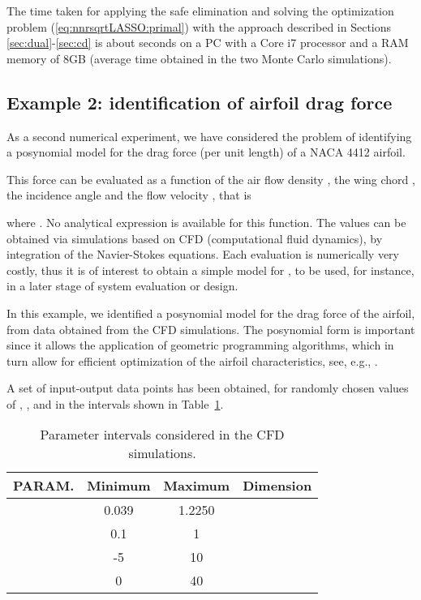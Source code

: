 \documentclass[11pt]{article}
\begin{document}
The time taken for applying the safe elimination and solving the optimization
problem (\ref{eq:nnrsqrtLASSO:primal}) with the approach described
in Sections \ref{sec:dual}-\ref{sec:cd} is about  seconds on
a PC with a Core i7 processor and a RAM memory of 8GB (average time
obtained in the two Monte Carlo simulations).

\subsection{Example 2: identification of airfoil drag force}

As a second numerical experiment, we have considered the problem of identifying
a posynomial model for the drag force (per unit length) of a NACA
4412 airfoil. 

This force can be evaluated as a function of the air flow
density , the wing chord , the incidence angle 
and the flow velocity , that is 

where . No analytical expression is available for this function. The values 
can be obtained via simulations based on CFD (computational fluid dynamics),
by integration of the Navier-Stokes equations. Each evaluation is
numerically very costly, thus it is of interest to obtain a simple
model for , to be used, for instance, in a later stage of
system evaluation or design. 

In this example, we identified a posynomial model for the drag force
of the airfoil, from data obtained from the CFD simulations. The posynomial
form is important since it allows the application of geometric programming
algorithms, which in turn allow for efficient optimization of the
airfoil characteristics, see, e.g., \cite{HoAb12}.


A set 
of  input-output data points has been obtained, for randomly
chosen values of , ,  and  in the intervals
shown in Table~\ref{tab_param}. 

\begin{table}[htb]
\centering

\begin{tabular}{|c|c|c|c|}
\hline 
PARAM.  & Minimum  & Maximum  & Dimension \tabularnewline
\hline 
  & 0.039  & 1.2250  &  \tabularnewline
\hline 
  & 0.1  & 1  &  \tabularnewline
\hline 
  & -5  & 10  &  \tabularnewline
\hline 
  & 0  & 40  &  \tabularnewline
\hline 
\end{tabular}\caption{Parameter intervals considered in the CFD simulations.}


\label{tab_param} 
\end{table}
\end{document}
